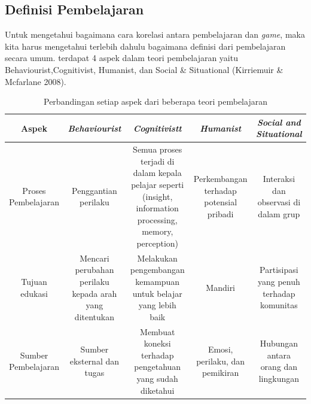 	\subsection{Definisi Pembelajaran}
		Untuk mengetahui bagaimana cara korelasi antara pembelajaran dan \textit{game}, maka kita harus mengetahui terlebih dahulu bagaimana definisi dari pembelajaran secara umum. terdapat 4 aspek dalam teori pembelajaran yaitu Behaviourist,Cognitivist, Humanist, dan Social \& Situational (Kirriemuir \& Mcfarlane 2008).
		\begin{table}
			\centering
			\caption{Perbandingan setiap aspek dari beberapa teori pembelajaran}
			\label{tab:tab1}
			\begin{tabular}{| c | c | c | c | c |}
				\hline
				Aspek & \textit{Behaviourist} & \textit{Cognitivistt} & \textit{Humanist} & \multicolumn{1}{p{2cm}|}{\textit{Social and Situational}} \\
				\hline
				\multicolumn{1}{|p{2cm}|}{\raggedright Proses Pembelajaran} & \multicolumn{1}{p{2.5cm}|}{\raggedright Penggantian perilaku} & \multicolumn{1}{p{2.5cm}|}{\raggedright Semua proses terjadi di dalam kepala pelajar seperti (insight, information processing, memory, perception)} & \multicolumn{1}{p{2.5cm}|}{\raggedright Perkembangan terhadap potensial pribadi} & \multicolumn{1}{p{2.5cm}|}{\raggedright Interaksi dan observasi di dalam grup} \\
				\hline
				\multicolumn{1}{|p{2cm}|}{Tujuan edukasi} & \multicolumn{1}{p{2.5cm}|}{\raggedright Mencari perubahan perilaku kepada arah yang ditentukan} & \multicolumn{1}{p{2.5cm}|}{\raggedright Melakukan pengembangan kemampuan untuk belajar yang lebih baik} & \multicolumn{1}{p{2.5cm}|}{Mandiri} & \multicolumn{1}{p{2.5cm}|}{\raggedright Partisipasi yang penuh terhadap komunitas} \\
				\hline
				\multicolumn{1}{|p{2cm}|}{Sumber Pembelajaran} & \multicolumn{1}{p{2.5cm}|}{\raggedright Sumber eksternal dan tugas} & \multicolumn{1}{p{2.5cm}|}{\raggedright Membuat koneksi terhadap pengetahuan yang sudah diketahui} & \multicolumn{1}{p{2.5cm}|}{\raggedright Emosi, perilaku, dan pemikiran} & \multicolumn{1}{p{2.5cm}|}{\raggedright Hubungan antara orang dan lingkungan} \\
				\hline
			\end{tabular}
		\end{table}
	
